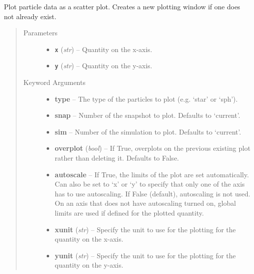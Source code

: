 \documentclass[letterpaper,10pt,english]{sphinxmanual}
\begin{document}
\begin{fulllineitems}
\label{index:facade.plot}
Plot particle data as a scatter plot.  Creates a new plotting window if
one does not already exist.
\begin{quote}\begin{description}
\item[{Parameters}] \leavevmode\begin{itemize}
\item {} 
\textbf{\texttt{x}} (\emph{str}) -- Quantity on the x-axis.

\item {} 
\textbf{\texttt{y}} (\emph{str}) -- Quantity on the y-axis.

\end{itemize}

\item[{Keyword Arguments}] \leavevmode\begin{itemize}
\item {} 
\textbf{type} --
The type of the particles to plot (e.g. `star' or `sph').

\item {} 
\textbf{snap} --
Number of the snapshot to plot. Defaults to `current'.

\item {} 
\textbf{sim} --
Number of the simulation to plot. Defaults to `current'.

\item {} 
\textbf{overplot} (\emph{bool}) --
If True, overplots on the previous existing plot rather
than deleting it. Defaults to False.

\item {} 
\textbf{autoscale} --
If True, the limits of the plot are set
automatically.  Can also be set to `x' or `y' to specify
that only one of the axis has to use autoscaling.
If False (default), autoscaling is not used. On an axis that does
not have autoscaling turned on, global limits are used
if defined for the plotted quantity.

\item {} 
\textbf{xunit} (\emph{str}) --
Specify the unit to use for the plotting for the quantity
on the x-axis.

\item {} 
\textbf{yunit} (\emph{str}) --
Specify the unit to use for the plotting for the quantity
on the y-axis.


\end{itemize}
\end{description}
\end{quote}
\end{fulllineitems}
\end{document}
